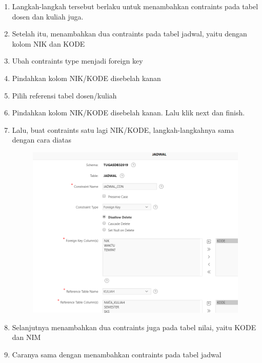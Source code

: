 \begin{enumerate}
    \item Langkah-langkah tersebut berlaku untuk menambahkan contraints pada tabel dosen dan kuliah juga.
    \item Setelah itu, menambahkan dua contraints pada tabel jadwal, yaitu dengan kolom NIK dan KODE
    \item Ubah contraints type menjadi foreign key
    \item Pindahkan kolom NIK/KODE disebelah kanan
    \item Pilih referensi tabel dosen/kuliah
    \item Pindahkan kolom NIK/KODE disebelah kanan. Lalu klik next dan finish.
    \item Lalu, buat contraints satu lagi NIK/KODE, langkah-langkahnya sama dengan cara diatas
    
\begin{figure}[!htbp]
    \centering
    \includegraphics[scale=0.5]{figure/cjd.png}
    \label{penanda}
\end{figure} 
    
    \item Selanjutnya menambahkan dua contraints juga pada tabel nilai, yaitu KODE dan NIM
    \item Caranya sama dengan menambahkan contraints pada tabel jadwal
    

\end{enumerate}
